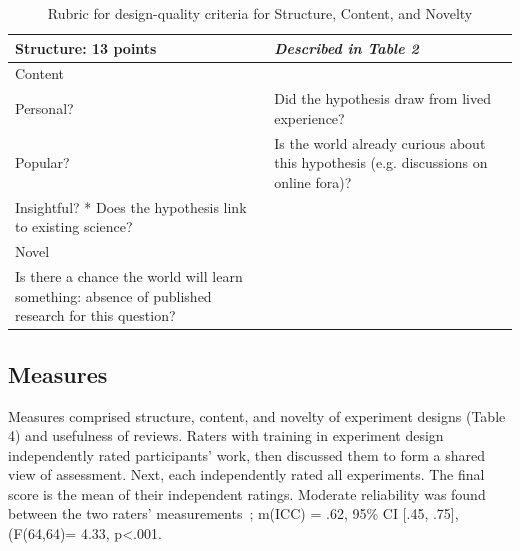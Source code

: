 \vspace{0.25in}
\begin{table}[!ht]
\caption[Rubric for design-quality criteria for Structure, Content, and Novelty]
{Rubric for design-quality criteria for Structure, Content, and Novelty}

\vspace{-0.25in}
\begin{center}
\begin{tabular}{|p{1in}|p{2in}|p{3in}|}

\hline
Structure: 13 points &  \textit{Described in Table 2} \\

\hline
Content  & \\
\hline
Personal? & Did the hypothesis draw from lived experience? \\
Popular? & Is the world already curious about this hypothesis (e.g. discussions on online fora)?  \\
Insightful? * Does the hypothesis link to existing science?  \\

\hline
Novel  &  \\
\hline
Is there a chance the world will learn something: absence of published research for this question? &  \\

\hline
\end{tabular}
\end{center}
\label{tab:rubric2}
\end{table}

\subsection{Measures}
Measures comprised structure, content, and novelty of experiment designs (Table 4) and usefulness of reviews. Raters with training in experiment design independently rated participants’ work, then discussed them to form a shared view of assessment. Next, each independently rated all experiments. The final score is the mean of their independent ratings. Moderate reliability was found between the two raters’ measurements~\cite{koo2016guideline}; m(ICC) = .62, 95\% CI [.45, .75], (F(64,64)= 4.33, p<.001. 

